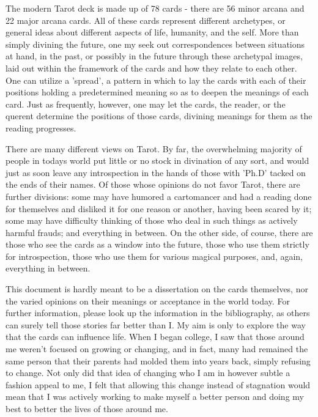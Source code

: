 \documentclass{article}
\begin{document}
The modern Tarot deck is made up of 78 cards - there are 56 minor arcana
and 22 major arcana cards.  All of these cards represent different
archetypes, or general ideas about different aspects of life, humanity,
and the self.  More than simply divining the future, one my seek out
correspondences between situations at hand, in the past, or possibly in
the future through these archetypal images, laid out within the
framework of the cards and how they relate to each other.  One can
utilize a 'spread', a pattern in which to lay the cards with each of
their positions holding a predetermined meaning so as to deepen the
meanings of each card.  Just as frequently, however, one may let the
cards, the reader, or the querent determine the positions of those
cards, divining meanings for them as the reading progresses.

There are many different views on Tarot.  By far, the overwhelming
majority of people in todays world put little or no stock in divination
of any sort, and would just as soon leave any introspection in the hands
of those with 'Ph.D' tacked on the ends of their names.  Of those whose
opinions do not favor Tarot, there are further divisions: some may have
humored a cartomancer and had a reading done for themselves and disliked
it for one reason or another, having been scared by it; some may have
difficulty thinking of those who deal in such things as actively harmful
frauds; and everything in between.  On the other side, of course, there
are those who see the cards as a window into the future, those who use
them strictly for introspection, those who use them for various magical
purposes, and, again, everything in between.

This document is hardly meant to be a dissertation on the cards
themselves, nor the varied opinions on their meanings or acceptance in
the world today.  For further information, please look up the
information in the bibliography, as others can surely tell those stories
far better than I.  My aim is only to explore the way that the cards can
influence life.  When I began college, I saw that those around me
weren't focused on growing or changing, and in fact, many had remained
the same person that their parents had molded them into years back,
simply refusing to change.  Not only did that idea of changing who I am
in however subtle a fashion appeal to me, I felt that allowing this
change instead of stagnation would mean that I was actively working to
make myself a better person and doing my best to better the lives of
those around me.
\end{document}
